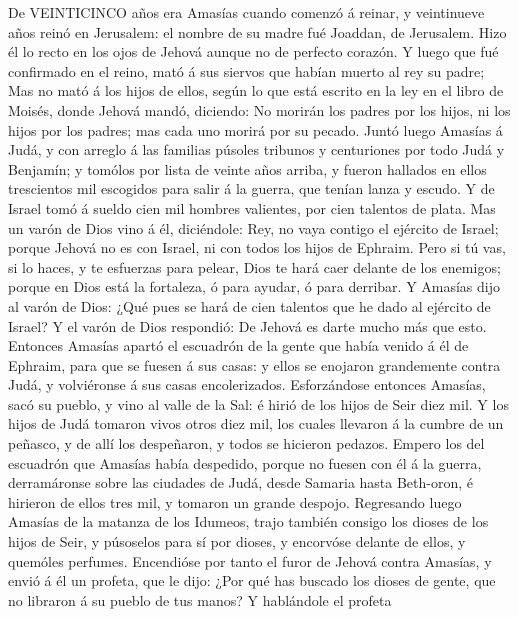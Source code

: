  De VEINTICINCO años era Amasías cuando comenzó á reinar, y
veintinueve años reinó en Jerusalem: el nombre de su madre fué Joaddan,
de Jerusalem.  Hizo él lo recto en los ojos de Jehová aunque
no de perfecto corazón.  Y luego que fué confirmado en el
reino, mató á sus siervos que habían muerto al rey su padre;
 Mas no mató á los hijos de ellos, según lo que está escrito
en la ley en el libro de Moisés, donde Jehová mandó, diciendo: No
morirán los padres por los hijos, ni los hijos por los padres; mas cada
uno morirá por su pecado.  Juntó luego Amasías á Judá, y con
arreglo á las familias púsoles tribunos y centuriones por todo Judá y
Benjamín; y tomólos por lista de veinte años arriba, y fueron hallados
en ellos trescientos mil escogidos para salir á la guerra, que tenían
lanza y escudo.  Y de Israel tomó á sueldo cien mil hombres
valientes, por cien talentos de plata.  Mas un varón de Dios
vino á él, diciéndole: Rey, no vaya contigo el ejército de Israel;
porque Jehová no es con Israel, ni con todos los hijos de Ephraim.
 Pero si tú vas, si lo haces, y te esfuerzas para pelear,
Dios te hará caer delante de los enemigos; porque en Dios está la
fortaleza, ó para ayudar, ó para derribar.  Y Amasías dijo
al varón de Dios: ¿Qué pues se hará de cien talentos que he dado al
ejército de Israel? Y el varón de Dios respondió: De Jehová es darte
mucho más que esto.  Entonces Amasías apartó el escuadrón
de la gente que había venido á él de Ephraim, para que se fuesen á sus
casas: y ellos se enojaron grandemente contra Judá, y volviéronse á sus
casas encolerizados.  Esforzándose entonces Amasías, sacó
su pueblo, y vino al valle de la Sal: é hirió de los hijos de Seir diez
mil.  Y los hijos de Judá tomaron vivos otros diez mil, los
cuales llevaron á la cumbre de un peñasco, y de allí los despeñaron, y
todos se hicieron pedazos.  Empero los del escuadrón que
Amasías había despedido, porque no fuesen con él á la guerra,
derramáronse sobre las ciudades de Judá, desde Samaria hasta Beth-oron,
é hirieron de ellos tres mil, y tomaron un grande despojo. 
Regresando luego Amasías de la matanza de los Idumeos, trajo también
consigo los dioses de los hijos de Seir, y púsoselos para sí por dioses,
y encorvóse delante de ellos, y quemóles perfumes. 
Encendióse por tanto el furor de Jehová contra Amasías, y envió á él un
profeta, que le dijo: ¿Por qué has buscado los dioses de gente, que no
libraron á su pueblo de tus manos?  Y hablándole el profeta
